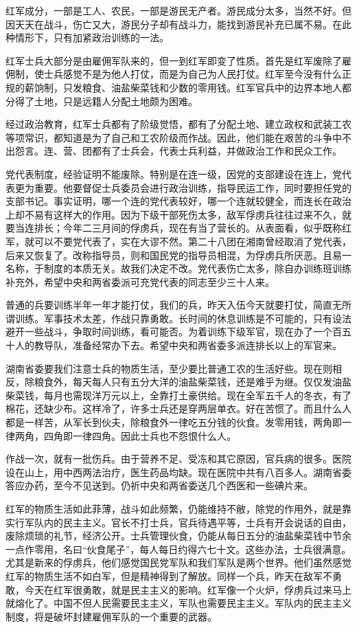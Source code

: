 红军成分，一部是工人、农民，一部是游民无产者。游民成分太多，当然不好。但因天天在战斗，伤亡又大，游民分子却有战斗力，能找到游民补充已属不易。在此种情形下，只有加紧政治训练的一法。

红军士兵大部分是由雇佣军队来的，但一到红军即变了性质。首先是红军废除了雇佣制，使士兵感觉不是为他人打仗，而是为自己为人民打仗。红军至今没有什么正规的薪饷制，只发粮食、油盐柴菜钱和少数的零用钱。红军官兵中的边界本地人都分得了土地，只是远籍人分配土地颇为困难。

经过政治教育，红军士兵都有了阶级觉悟，都有了分配土地、建立政权和武装工农等项常识，都知道是为了自己和工农阶级而作战。因此，他们能在艰苦的斗争中不出怨言。连、营、团都有了士兵会，代表士兵利益，并做政治工作和民众工作。

党代表制度，经验证明不能废除。特别是在连一级，因党的支部建设在连上，党代表更为重要。他要督促士兵委员会进行政治训练，指导民运工作，同时要担任党的支部书记。事实证明，哪一个连的党代表较好，哪一个连就较健全，而连长在政治上却不易有这样大的作用。因为下级干部死伤太多，敌军俘虏兵往往过来不久，就要当连排长；今年二三月间的俘虏兵，现在有当了营长的。从表面看，似乎既称红军，就可以不要党代表了，实在大谬不然。第二十八团在湘南曾经取消了党代表，后来又恢复了。改称指导员，则和国民党的指导员相混，为俘虏兵所厌恶。且易一名称，于制度的本质无关。故我们决定不改。党代表伤亡太多，除自办训练班训练补充外，希望中央和两省委派可充党代表的同志至少三十人来。

普通的兵要训练半年一年才能打仗，我们的兵，昨天入伍今天就要打仗，简直无所谓训练。军事技术太差，作战只靠勇敢。长时间的休息训练是不可能的，只有设法避开一些战斗，争取时间训练，看可能否。为着训练下级军官，现在办了一个百五十人的教导队，准备经常办下去。希望中央和两省委多派连排长以上的军官来。

湖南省委要我们注意士兵的物质生活，至少要比普通工农的生活好些。现在则相反，除粮食外，每天每人只有五分大洋的油盐柴菜钱，还是难乎为继。仅仅发油盐柴菜钱，每月也需现洋万元以上，全靠打土豪供给。现在全军五千人的冬衣，有了棉花，还缺少布。这样冷了，许多士兵还是穿两层单衣。好在苦惯了。而且什么人都是一样苦，从军长到伙夫，除粮食外一律吃五分钱的伙食。发零用钱，两角即一律两角，四角即一律四角。因此士兵也不怨恨什么人。

作战一次，就有一批伤兵。由于营养不足、受冻和其它原因，官兵病的很多。医院设在山上，用中西两法治疗，医生药品均缺。现在医院中共有八百多人。湖南省委答应办药，至今不见送到。仍祈中央和两省委送几个西医和一些碘片来。

红军的物质生活如此菲薄，战斗如此频繁，仍能维持不敝，除党的作用外，就是靠实行军队内的民主主义。官长不打士兵，官兵待遇平等，士兵有开会说话的自由，废除烦琐的礼节，经济公开。士兵管理伙食，仍能从每日五分的油盐柴菜钱中节余一点作零用，名曰“伙食尾子”，每人每日约得六七十文。这些办法，士兵很满意。尤其是新来的俘虏兵，他们感觉国民党军队和我们军队是两个世界。他们虽然感觉红军的物质生活不如白军，但是精神得到了解放。同样一个兵，昨天在敌军不勇敢，今天在红军很勇敢，就是民主主义的影响。红军像一个火炉，俘虏兵过来马上就熔化了。中国不但人民需要民主主义，军队也需要民主主义。军队内的民主主义制度，将是破坏封建雇佣军队的一个重要的武器。

